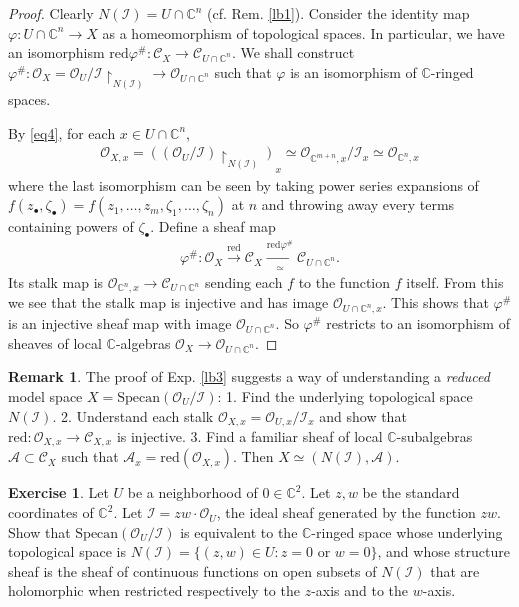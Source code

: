 \documentclass[12pt,b5paper,notitlepage]{report}
\theoremstyle{definition}
\newtheorem{exe}[df]{Exercise}
\newtheorem{rem}[df]{Remark}
\theoremstyle{plain}
\newcommand{\mc}{\mathcal}
\newcommand{\scr}{\mathscr}
\newcommand{\blt}{\bullet}
\newcommand{\Cbb}{\mathbb C}
\newcommand{\Specan}{\mathrm{Specan}}
\newcommand{\red}{\mathrm{red}}
\newcommand{\uph}{\upharpoonright}
\numberwithin{equation}{section}
\begin{document}
\begin{proof}
Clearly $N(\mc I)=U\cap \Cbb^n$ (cf. Rem. \ref{lb1}). Consider the identity map $\varphi:U\cap\Cbb^n\rightarrow X$ as a homeomorphism of topological spaces. In particular, we have an isomorphism $\red\varphi^\#:\scr C_X\rightarrow\scr C_{U\cap\Cbb^n}$. We shall construct $\varphi^\#:\scr O_X=\scr O_U/\mc I\uph_{N(\mc I)}\rightarrow\scr O_{U\cap\Cbb^n}$ such that $\varphi$ is an isomorphism of $\Cbb$-ringed spaces.

By \eqref{eq4}, for each $x\in U\cap\Cbb^n$,
\begin{align*}
\scr O_{X,x}=((\scr O_U/\mc I)\uph_{N(\mc I)})_x\simeq\scr O_{\Cbb^{m+n},x}/\mc I_x\simeq\scr O_{\Cbb^n,x}
\end{align*}
where the last isomorphism can be seen  by taking power series expansions of $f(z_\blt,\zeta_\blt)=f(z_1,\dots,z_m,\zeta_1,\dots,\zeta_n)$ at $n$ and throwing away every terms containing powers of $\zeta_\blt$. Define a sheaf map
\begin{align*}
\varphi^\#:\scr O_X\xrightarrow{\red}\scr C_X\xrightarrow[\simeq]{\red\varphi^\#}\scr C_{U\cap\Cbb^n}.
\end{align*}
Its stalk map is $\scr O_{\Cbb^n,x}\rightarrow\scr C_{U\cap\Cbb^n}$ sending each $f$ to the function $f$ itself. From this we see that the stalk map is injective and has image $\scr O_{U\cap\Cbb^n,x}$. This shows that $\varphi^\#$ is an injective sheaf map with image $\scr O_{U\cap\Cbb^n}$. So $\varphi^\#$ restricts to an isomorphism of sheaves of local $\Cbb$-algebras $\scr O_X\rightarrow\scr O_{U\cap\Cbb^n}$.
\end{proof}



\begin{rem}
The proof of Exp. \ref{lb3} suggests a way of understanding a \emph{reduced} model space $X=\Specan(\scr O_U/\mc I)$: 1. Find the underlying topological space $N(\mc I)$. 2. Understand each stalk $\scr O_{X,x}=\scr O_{U,x}/\mc I_x$ and show that $\red:\scr O_{X,x}\rightarrow\scr C_{X,x}$ is injective. 3. Find a familiar sheaf of local $\Cbb$-subalgebras $\scr A\subset\scr C_X$ such that $\scr A_x=\red(\scr O_{X,x})$. Then $X\simeq (N(\mc I),\scr A)$.
\end{rem}


\begin{exe}
Let $U$ be a neighborhood of $0\in\Cbb^2$. Let $z,w$ be the standard coordinates of $\Cbb^2$. Let $\mc I=zw\cdot \scr O_U$, the ideal sheaf generated by the function $zw$. Show that $\Specan(\scr O_U/\mc I)$ is equivalent to the $\Cbb$-ringed space whose underlying topological space  is $N(\mc I)=\{(z,w)\in U:z=0\text{ or }w=0\}$, and whose structure sheaf is the sheaf of continuous functions on open subsets of $N(\mc I)$ that are holomorphic when restricted respectively to the $z$-axis and to the $w$-axis.
\end{exe}
\end{document}
